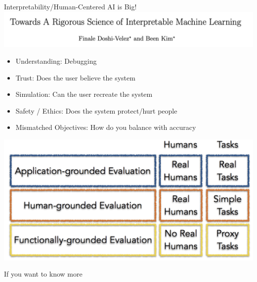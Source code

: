 \documentclass[compress]{beamer}
\newcommand{\fsi}[2]{
\begin{frame}[plain]
\vspace*{-1pt}
\makebox[\linewidth]{\texttt{[image: \#1]}}
\begin{center}
#2
\end{center}
\end{frame}
}
\begin{document}
\begin{frame}{Interpretability/Human-Centered AI is Big!}
  \includegraphics[width=0.9\paperwidth]{general_figures/doshi-velez_kim}

  \begin{itemize}
  \item Understanding: Debugging
  \item Trust: Does the user believe the system
  \item Simulation: Can the user recreate the system
  \item Safety / Ethics: Does the system protect/hurt people
  \item Mismatched Objectives: How do you balance with accuracy
  \end{itemize}

  \begin{center}
    \includegraphics[width=0.5\paperwidth]{general_figures/interpretability_hierarchy}
    \end{center}
\end{frame}


\fsi{general_figures/chenhao_tutorial}{If you want to know more}
\end{document}
